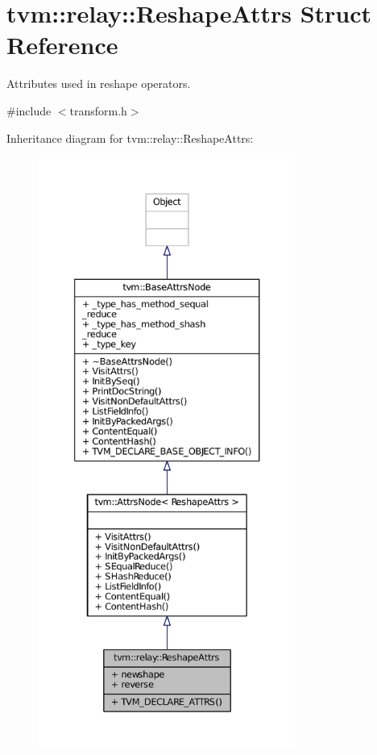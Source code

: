 \hypertarget{structtvm_1_1relay_1_1ReshapeAttrs}{}\section{tvm\+:\+:relay\+:\+:Reshape\+Attrs Struct Reference}
\label{structtvm_1_1relay_1_1ReshapeAttrs}


Attributes used in reshape operators.  




{\ttfamily \#include $<$transform.\+h$>$}



Inheritance diagram for tvm\+:\+:relay\+:\+:Reshape\+Attrs\+:
\nopagebreak
\begin{figure}[H]
\begin{center}
\leavevmode
\includegraphics[height=550pt]{structtvm_1_1relay_1_1ReshapeAttrs__inherit__graph}
\end{center}
\end{figure}


